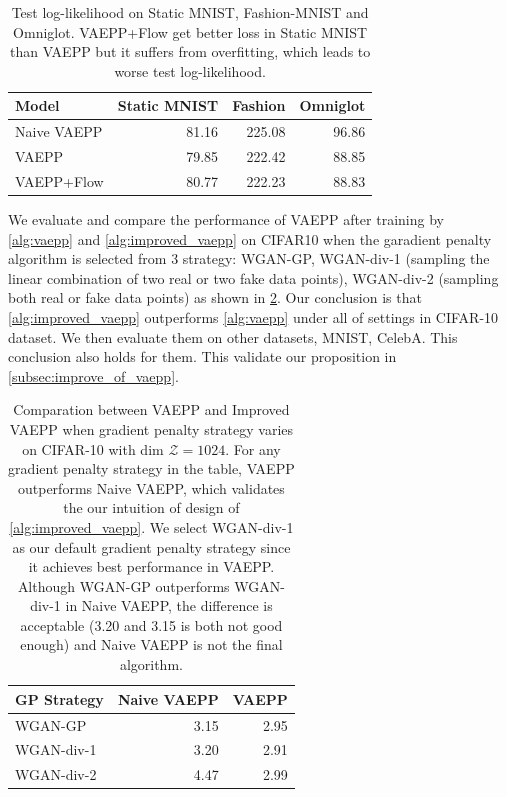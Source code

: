 \begin{table}[tb]
\centering
\begin{tabular}{lrrr}  
\toprule
Model   & Static MNIST & Fashion & Omniglot \\
\midrule
Naive VAEPP    &  81.16    &  225.08  &  96.86  \\
VAEPP          &  79.85    &  222.42  &  88.85   \\
VAEPP+Flow     &  80.77    &  222.23  &  88.83   \\
\bottomrule
\end{tabular}
\caption{Test log-likelihood on Static MNIST, Fashion-MNIST and Omniglot. VAEPP+Flow get better loss in Static MNIST than VAEPP but it suffers from overfitting, which leads to worse test log-likelihood. }
\label{tab:cifar-nll}
\end{table}
We evaluate and compare the performance of VAEPP after training by \cref{alg:vaepp} and \cref{alg:improved_vaepp} on CIFAR10 when the garadient penalty algorithm is selected from 3 strategy: WGAN-GP, WGAN-div-1  (sampling the linear combination of two real or two fake data points), WGAN-div-2 (sampling both real or fake data points) as shown in \cref{tab:compare_nD_over_R}. Our conclusion is that \cref{alg:improved_vaepp} outperforms \cref{alg:vaepp} under all of settings in CIFAR-10 dataset. We then evaluate them on other datasets, MNIST, CelebA. This conclusion also holds for them. This validate our proposition in \cref{subsec:improve_of_vaepp}. 
\begin{table}[tb]
\centering
\begin{tabular}{lrr}  
\toprule
GP Strategy  &  Naive VAEPP  & VAEPP \\
\midrule
WGAN-GP      &  3.15   & 2.95      \\
WGAN-div-1   &  3.20   & 2.91      \\
WGAN-div-2   &  4.47   & 2.99      \\
\bottomrule
\end{tabular}
\caption{Comparation between VAEPP and Improved VAEPP when gradient penalty strategy varies on CIFAR-10 with dim $\mathcal{Z} = 1024$. For any gradient penalty strategy in the table, VAEPP outperforms Naive VAEPP, which validates the our intuition of design of \cref{alg:improved_vaepp}. We select WGAN-div-1 as our default gradient penalty strategy since it achieves best performance in VAEPP. Although WGAN-GP outperforms WGAN-div-1 in Naive VAEPP, the difference is acceptable (3.20 and 3.15 is both not good enough) and Naive VAEPP is not the final algorithm. }
\label{tab:compare_nD_over_R}
\end{table}

